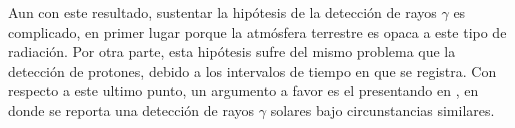 Aun con este resultado, sustentar la hipótesis de la detección de rayos $\gamma$ es complicado, en primer lugar porque la atmósfera terrestre es opaca a este tipo de radiación. Por otra parte, esta hipótesis sufre del mismo problema que la detección de protones, debido a los intervalos de tiempo en que se registra. Con respecto a este ultimo punto, un argumento a favor es el presentando en \cite{muraki20}, en donde se reporta una detección de rayos $\gamma$ solares bajo circunstancias similares.
